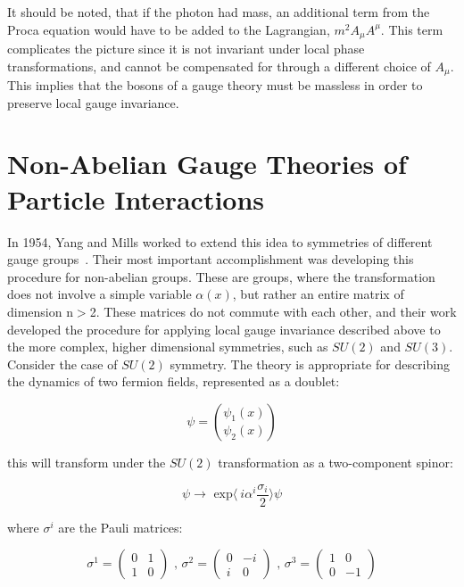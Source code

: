 \par It should be noted, that if the photon had mass, an additional
term from the Proca equation would have to be added to the Lagrangian,
$m^{2}A_{\mu}A^{\mu}$.  This term complicates the picture since it is
not invariant under local phase transformations, and cannot be
compensated for through a different choice of $A_{\mu}$.  This implies
that the bosons of a gauge theory must be massless in order to
preserve local gauge invariance.  


\section{Non-Abelian Gauge Theories of Particle Interactions}
\label{non_abelian_gauge_theory_overview}
\par In 1954, Yang and Mills worked to extend this idea to symmetries
of different gauge groups~\cite{th:Yang_Mills}.  Their most important
accomplishment was developing this procedure for non-abelian groups.
These are groups, where the transformation does not involve a simple
variable $\alpha(x)$, but rather an entire matrix of dimension n$>$2.
These matrices do not commute with each other, and their work developed
the procedure for applying local gauge invariance described above to
the more complex, higher dimensional symmetries, such as $SU(2)$ and
$SU(3)$.  Consider the case of $SU(2)$ symmetry.  The theory is
appropriate for describing the dynamics of two fermion fields,
represented as a doublet:

\begin{equation}\label{eq:yang_mills_fermion_doublet}
\psi = \binom{\psi_{1}(x)}{\psi_{2}(x)}
\end{equation}

\noindent this will transform under the $SU(2)$ transformation as a
two-component spinor:

\begin{equation}\label{eq:yang_mills_fermion_transformaiton}
\psi \rightarrow \text{ exp}\langle~i\alpha^{i}\frac{\sigma_{i}}{2}\rangle\psi
\end{equation} 

\noindent where $\sigma^{i}$ are the Pauli matrices:

\begin{equation}\label{eq:pauli_matrices}
\sigma^{1} = 
  \begin{pmatrix}
    0  &  1 \\
    1  &  0
  \end{pmatrix}
\text{   ,    }
\sigma^{2} = 
  \begin{pmatrix}
    0  & -i \\
    i  &  0
  \end{pmatrix}
\text{   ,   }
\sigma^{3} = 
  \begin{pmatrix}
    1  &   0 \\
    0  & -1
  \end{pmatrix}
\end{equation}

